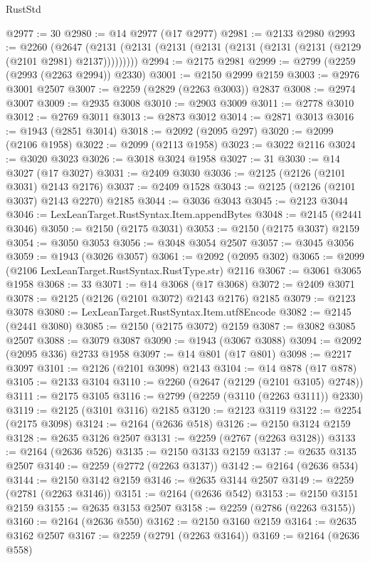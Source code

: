 \begin{lexlean}{RustStd}
\begin{coremodule}
@2977 := 30
@2980 := @14 @2977 (@17 @2977)
@2981 := @2133 @2980
@2993 := @2260
    (@2647 (@2131 (@2131 (@2131 (@2131 (@2131 (@2131 (@2131 (@2129 (@2101 @2981) @2137)))))))))
@2994 := @2175 @2981
@2999 := @2799 (@2259 (@2993 (@2263 @2994)) @2330)
@3001 := @2150 @2999 @2159
@3003 := @2976 @3001 @2507
@3007 := @2259 (@2829 (@2263 @3003)) @2837
@3008 := @2974 @3007
@3009 := @2935 @3008
@3010 := @2903 @3009
@3011 := @2778 @3010
@3012 := @2769 @3011
@3013 := @2873 @3012
@3014 := @2871 @3013
@3016 := @1943 (@2851 @3014)
@3018 := @2092 (@2095 @297)
@3020 := @2099 (@2106 @1958)
@3022 := @2099 (@2113 @1958)
@3023 := @3022 @2116
@3024 := @3020 @3023
@3026 := @3018 @3024 @1958
@3027 := 31
@3030 := @14 @3027 (@17 @3027)
@3031 := @2409 @3030
@3036 := @2125 (@2126 (@2101 @3031) @2143 @2176)
@3037 := @2409 @1528
@3043 := @2125 (@2126 (@2101 @3037) @2143 @2270) @2185
@3044 := @3036 @3043
@3045 := @2123 @3044
@3046 := LexLeanTarget.RustSyntax.Item.appendBytes
@3048 := @2145 (@2441 @3046)
@3050 := @2150 (@2175 @3031)
@3053 := @2150 (@2175 @3037) @2159
@3054 := @3050 @3053
@3056 := @3048 @3054 @2507
@3057 := @3045 @3056
@3059 := @1943 (@3026 @3057)
@3061 := @2092 (@2095 @302)
@3065 := @2099 (@2106 LexLeanTarget.RustSyntax.RustType.str) @2116
@3067 := @3061 @3065 @1958
@3068 := 33
@3071 := @14 @3068 (@17 @3068)
@3072 := @2409 @3071
@3078 := @2125 (@2126 (@2101 @3072) @2143 @2176) @2185
@3079 := @2123 @3078
@3080 := LexLeanTarget.RustSyntax.Item.utf8Encode
@3082 := @2145 (@2441 @3080)
@3085 := @2150 (@2175 @3072) @2159
@3087 := @3082 @3085 @2507
@3088 := @3079 @3087
@3090 := @1943 (@3067 @3088)
@3094 := @2092 (@2095 @336) @2733 @1958
@3097 := @14 @801 (@17 @801)
@3098 := @2217 @3097
@3101 := @2126 (@2101 @3098) @2143
@3104 := @14 @878 (@17 @878)
@3105 := @2133 @3104
@3110 := @2260 (@2647 (@2129 (@2101 @3105) @2748))
@3111 := @2175 @3105
@3116 := @2799 (@2259 (@3110 (@2263 @3111)) @2330)
@3119 := @2125 (@3101 @3116) @2185
@3120 := @2123 @3119
@3122 := @2254 (@2175 @3098)
@3124 := @2164 (@2636 @518)
@3126 := @2150 @3124 @2159
@3128 := @2635 @3126 @2507
@3131 := @2259 (@2767 (@2263 @3128))
@3133 := @2164 (@2636 @526)
@3135 := @2150 @3133 @2159
@3137 := @2635 @3135 @2507
@3140 := @2259 (@2772 (@2263 @3137))
@3142 := @2164 (@2636 @534)
@3144 := @2150 @3142 @2159
@3146 := @2635 @3144 @2507
@3149 := @2259 (@2781 (@2263 @3146))
@3151 := @2164 (@2636 @542)
@3153 := @2150 @3151 @2159
@3155 := @2635 @3153 @2507
@3158 := @2259 (@2786 (@2263 @3155))
@3160 := @2164 (@2636 @550)
@3162 := @2150 @3160 @2159
@3164 := @2635 @3162 @2507
@3167 := @2259 (@2791 (@2263 @3164))
@3169 := @2164 (@2636 @558)

\end{coremodule}
\end{lexlean}
